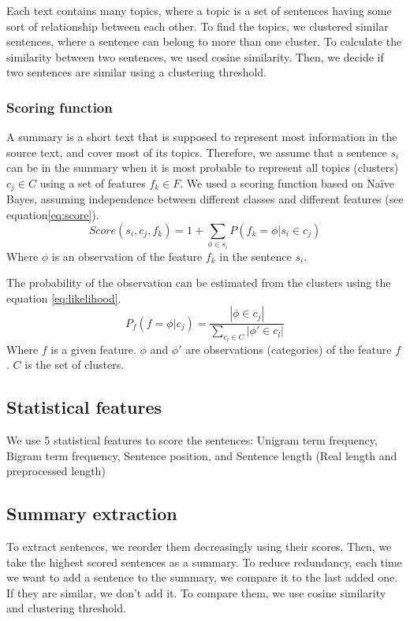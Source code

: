 \documentclass{LCSI_PhD}
\begin{document}
Each text contains many topics, where a topic is a set of sentences having some sort of relationship between each other.
To find the topics, we clustered similar sentences, where a sentence can belong to more than one cluster.
To calculate the similarity between two sentences, we used cosine similarity.
Then, we decide if two sentences are similar using a clustering threshold.

\subsubsection{Scoring function}

A summary is a short text that is supposed to represent most information in the source text, and cover most of its topics.
Therefore, we assume that a sentence $ s_i $ can be in the summary when it is most probable to represent all topics (clusters) $ c_j \in C $ using a set of features $ f_k \in F $.
We used a scoring function based on Na\"ive Bayes, assuming independence between different classes and different features (see equation\ref{eq:score}). 
\begin{equation}
\label{eq:score}
Score(s_i , c_j , f_k ) = 1 + \sum_{\phi \in s_i} {P(f_k=\phi | s_i \in c_j)}
\end{equation}
Where $ \phi $ is an observation of the feature $ f_k $ in the sentence $ s_i $.

The probability of the observation can be estimated from the clusters using the equation \ref{eq:likelihood}.
\begin{equation}
\label{eq:likelihood}
P_{f}(f = \phi | c_j) = \frac {|\phi \in c_j|}{\sum_{c_l \in C}{|\phi' \in c_l|}}
\end{equation}
Where $ f $ is a given feature.
$ \phi $ and $ \phi' $ are observations (categories) of the feature $ f $ .
$ C $ is the set of clusters.

\subsection{Statistical features}

We use 5 statistical features to score the sentences:
Unigram term frequency, 
Bigram term frequency,
Sentence position, and
Sentence length (Real length and preprocessed length)



\subsection{Summary extraction}
To extract sentences, we reorder them decreasingly using their scores. 
Then, we take the highest scored sentences as a summary. 
To reduce redundancy, each time we want to add a sentence to the summary, we compare it to the last added one. 
If they are similar, we don't add it. 
To compare them, we use cosine similarity and clustering threshold.
\end{document}
